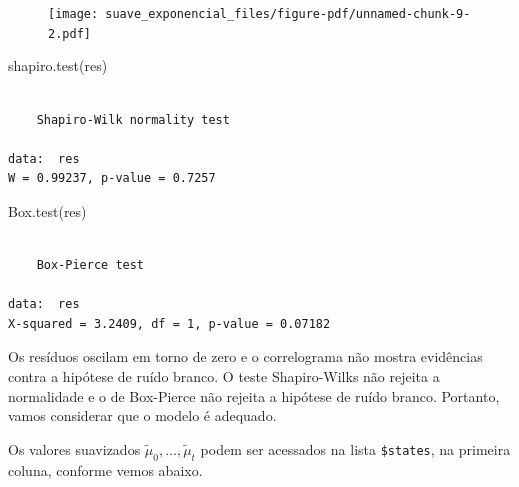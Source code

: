 \documentclass[
  letterpaper,
  DIV=11,
  numbers=noendperiod]{scrreprt}
\newenvironment{Shaded}{\begin{snugshade}}{\end{snugshade}}
\newcommand{\AttributeTok}[1]{\textcolor[rgb]{0.40,0.45,0.13}{#1}}
\newcommand{\DecValTok}[1]{\textcolor[rgb]{0.68,0.00,0.00}{#1}}
\newcommand{\FunctionTok}[1]{\textcolor[rgb]{0.28,0.35,0.67}{#1}}
\newcommand{\NormalTok}[1]{\textcolor[rgb]{0.00,0.23,0.31}{#1}}
\newcommand{\SpecialCharTok}[1]{\textcolor[rgb]{0.37,0.37,0.37}{#1}}
\newcommand{\StringTok}[1]{\textcolor[rgb]{0.13,0.47,0.30}{#1}}
\theoremstyle{definition}
\theoremstyle{plain}
\theoremstyle{definition}
\theoremstyle{plain}
\theoremstyle{remark}
\begin{document}
\begin{figure}[H]

{\centering \texttt{[image: suave\_exponencial\_files/figure-pdf/unnamed-chunk-9-2.pdf]}

}

\end{figure}

\begin{Shaded}
\begin{Highlighting}[]
\FunctionTok{shapiro.test}\NormalTok{(res)}
\end{Highlighting}
\end{Shaded}

\begin{verbatim}

    Shapiro-Wilk normality test

data:  res
W = 0.99237, p-value = 0.7257
\end{verbatim}

\begin{Shaded}
\begin{Highlighting}[]
\FunctionTok{Box.test}\NormalTok{(res)}
\end{Highlighting}
\end{Shaded}

\begin{verbatim}

    Box-Pierce test

data:  res
X-squared = 3.2409, df = 1, p-value = 0.07182
\end{verbatim}

Os resíduos oscilam em torno de zero e o correlograma não mostra
evidências contra a hipótese de ruído branco. O teste Shapiro-Wilks não
rejeita a normalidade e o de Box-Pierce não rejeita a hipótese de ruído
branco. Portanto, vamos considerar que o modelo é adequado.

Os valores suavizados \(\tilde{\mu}_0,\ldots,\tilde{\mu}_t\) podem ser
acessados na lista \texttt{\$states}, na primeira coluna, conforme vemos
abaixo.

\begin{Shaded}
\end{Shaded}
\end{document}
